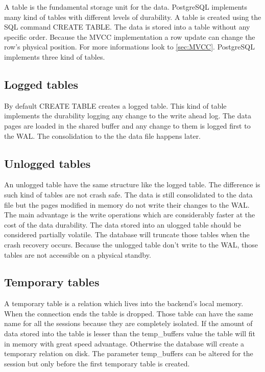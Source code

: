 A table is the fundamental storage unit for the data. PostgreSQL implements many kind of tables
with different levels of durability. A table is created using the SQL command CREATE TABLE. The data
is stored into a table without any specific order. Because the MVCC implementation a row update can
change the row's physical position. For more informations look to \ref{sec:MVCC}. PostgreSQL
implements three kind of tables.

\subsection{Logged tables}
By default CREATE TABLE creates a logged table. This kind of table implements the durability
logging any change to the write ahead log. The data pages are loaded in the shared buffer and any
change to them is logged first to the WAL. The consolidation to the the data file happens later.

\subsection{Unlogged tables}
\label{sub:UNLOGGEDTABLES}
An unlogged table have the same structure like the logged table. The difference is such kind of
tables are not crash safe. The data is still consolidated to the data file but the pages modified
in memory do not write their changes to the WAL. The main advantage is the write operations which
are considerably faster at the cost of the data durability. The data stored into an ulogged table
should be considered partially volatile. The database will truncate those tables when the crash
recovery occurs. Because the unlogged table don't write to the WAL, those tables are not accessible
on a physical standby.

\subsection{Temporary tables}
A temporary table is a relation which lives into the backend's local memory. When the connection
ends the table is dropped. Those table can have the same name for all the sessions because
they are completely isolated. If the amount of data stored into the table is lesser than
the temp\_buffers value the table will fit in memory with great speed advantage. Otherwise the
database will create a temporary relation on disk. The parameter temp\_buffers can be altered for
the session but only before the first temporary table is created.


